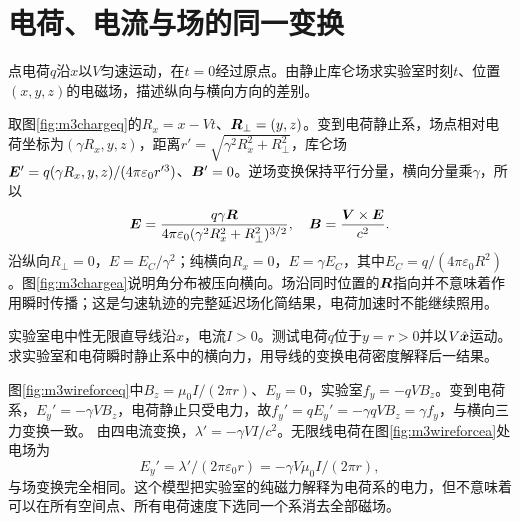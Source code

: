 \section{电荷、电流与场的同一变换}
\begin{example}\label{ex:m3movingcharge}
点电荷$q$沿$x$以$V$匀速运动，在$t=0$经过原点。由静止库仑场求实验室时刻$t$、位置$(x,y,z)$的电磁场，描述纵向与横向方向的差别。
\end{example}
\begin{solution}
取图\ref{fig:m3chargeq}的$R_x=x-Vt$、$\bm{R}_\perp=(y,z)$。变到电荷静止系，场点相对电荷坐标为$(\gamma R_x,y,z)$，距离$r'=\sqrt{\gamma^2R_x^2+R_\perp^2}$，库仑场$\bm{E}'=q(\gamma R_x,y,z)/(4\pi\varepsilon_0r'^3)$、$\bm{B}'=0$。逆场变换保持平行分量，横向分量乘$\gamma$，所以
\[
 \bm{E}=\frac{q\gamma\bm{R}}{4\pi\varepsilon_0(\gamma^2R_x^2+R_\perp^2)^{3/2}},\quad
 \bm{B}=\frac{\bm{V}\times\bm{E}}{c^2}.
\]
沿纵向$R_\perp=0$，$E=E_C/\gamma^2$；纯横向$R_x=0$，$E=\gamma E_C$，其中$E_C=q/(4\pi\varepsilon_0R^2)$。图\ref{fig:m3chargea}说明角分布被压向横向。场沿同时位置的$\bm{R}$指向并不意味着作用瞬时传播；这是匀速轨迹的完整延迟场化简结果，电荷加速时不能继续照用。
\end{solution}

\begin{example}\label{ex:m3wireforce}
实验室电中性无限直导线沿$x$，电流$I>0$。测试电荷$q$位于$y=r>0$并以$V\hat{\bm{x}}$运动。求实验室和电荷瞬时静止系中的横向力，用导线的变换电荷密度解释后一结果。
\end{example}
\begin{solution}
图\ref{fig:m3wireforceq}中$B_z=\mu_0I/(2\pi r)$、$E_y=0$，实验室$f_y=-qVB_z$。变到电荷系，$E_y'=-\gamma VB_z$，电荷静止只受电力，故$f_y'=qE_y'=-\gamma qVB_z=\gamma f_y$，与横向三力变换一致。
由四电流变换，$\lambda'=-\gamma VI/c^2$。无限线电荷在图\ref{fig:m3wireforcea}处电场为
\[
 E_y'=\lambda'/(2\pi\varepsilon_0r)=-\gamma V\mu_0I/(2\pi r),
\]
与场变换完全相同。这个模型把实验室的纯磁力解释为电荷系的电力，但不意味着可以在所有空间点、所有电荷速度下选同一个系消去全部磁场。
\end{solution}

